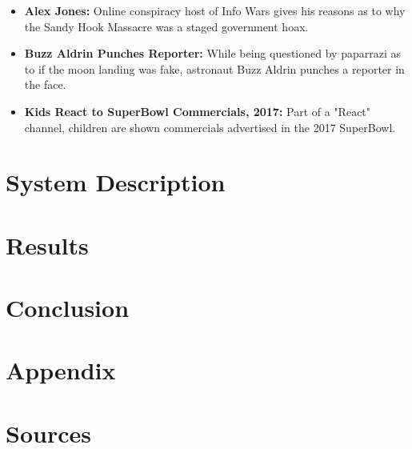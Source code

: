 \documentclass[letterpaper]{article}
\begin{document}
\begin{itemize}
	\item \textbf{Alex Jones:} Online conspiracy host of Info Wars gives his reasons as to why the Sandy Hook Massacre was a staged government hoax.
	\item \textbf{Buzz Aldrin Punches Reporter:} While being questioned by paparrazi as to if the moon landing was fake, astronaut Buzz Aldrin punches a reporter in the face.
	\item \textbf{Kids React to SuperBowl Commercials, 2017:} Part of a "React" channel, children are shown commercials advertised in the 2017 SuperBowl.
\end{itemize}

\section{System Description}

\section{Results}

\section{Conclusion}

\section{Appendix}

\section{Sources}
\end{document}
